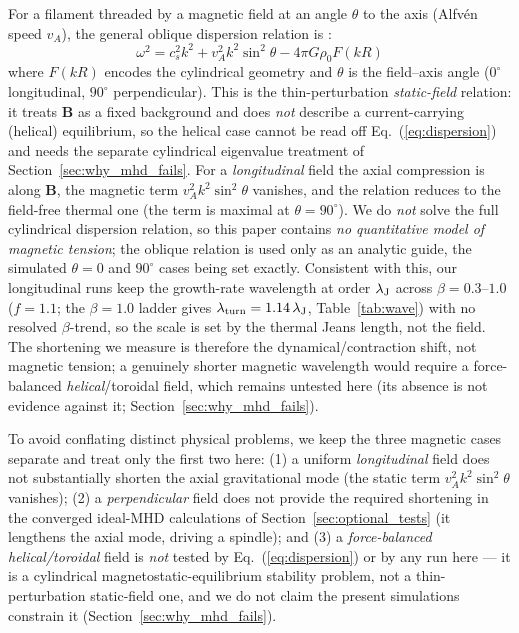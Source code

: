 \documentclass[usenatbib,twoside,twocolumn]{mnras}
\begin{document}
For a filament threaded by a magnetic field at an angle $\theta$ to the axis (Alfv\'en speed $v_A$), the general oblique dispersion relation is \citep{Nakamura1993}:
\begin{equation}
\omega^2 = c_s^2 k^2 + v_A^2 k^2 \sin^2\theta - 4\pi G\rho_0 F(kR)
\label{eq:dispersion}
\end{equation}
where $F(kR)$ encodes the cylindrical geometry and $\theta$ is the field--axis angle ($0^\circ$ longitudinal, $90^\circ$ perpendicular). This is the thin-perturbation \emph{static-field} relation: it treats $\mathbf{B}$ as a fixed background and does \emph{not} describe a current-carrying (helical) equilibrium, so the helical case cannot be read off Eq.~(\ref{eq:dispersion}) and needs the separate cylindrical eigenvalue treatment of Section~\ref{sec:why_mhd_fails}. For a \emph{longitudinal} field the axial compression is along $\mathbf{B}$, the magnetic term $v_A^2k^2\sin^2\theta$ vanishes, and the relation reduces to the field-free thermal one (the term is maximal at $\theta=90^\circ$). We do \emph{not} solve the full cylindrical dispersion relation, so this paper contains \emph{no quantitative model of magnetic tension}; the oblique relation is used only as an analytic guide, the simulated $\theta=0$ and $90^\circ$ cases being set exactly. Consistent with this, our longitudinal runs keep the growth-rate wavelength at order $\lambda_{\rm J}$ across $\beta=0.3$--$1.0$ ($f=1.1$; the $\beta=1.0$ ladder gives $\lambda_{\rm turn}=1.14\,\lambda_{\rm J}$, Table~\ref{tab:wave}) with no resolved $\beta$-trend, so the scale is set by the thermal Jeans length, not the field. The shortening we measure is therefore the dynamical/contraction shift, not magnetic tension; a genuinely shorter magnetic wavelength would require a force-balanced \emph{helical}/toroidal field, which remains untested here (its absence is not evidence against it; Section~\ref{sec:why_mhd_fails}).

To avoid conflating distinct physical problems, we keep the three magnetic cases separate and treat only the first two here: (1) a uniform \emph{longitudinal} field does not substantially shorten the axial gravitational mode (the static term $v_A^2k^2\sin^2\theta$ vanishes); (2) a \emph{perpendicular} field does not provide the required shortening in the converged ideal-MHD calculations of Section~\ref{sec:optional_tests} (it lengthens the axial mode, driving a spindle); and (3) a \emph{force-balanced helical/toroidal} field is \emph{not} tested by Eq.~(\ref{eq:dispersion}) or by any run here --- it is a cylindrical magnetostatic-equilibrium stability problem, not a thin-perturbation static-field one, and we do not claim the present simulations constrain it (Section~\ref{sec:why_mhd_fails}).
\end{document}
